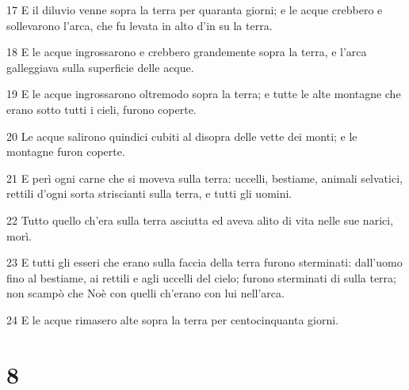 \par 17 E il diluvio venne sopra la terra per quaranta giorni; e le acque crebbero e sollevarono l'arca, che fu levata in alto d'in su la terra.
\par 18 E le acque ingrossarono e crebbero grandemente sopra la terra, e l'arca galleggiava sulla superficie delle acque.
\par 19 E le acque ingrossarono oltremodo sopra la terra; e tutte le alte montagne che erano sotto tutti i cieli, furono coperte.
\par 20 Le acque salirono quindici cubiti al disopra delle vette dei monti; e le montagne furon coperte.
\par 21 E perì ogni carne che si moveva sulla terra: uccelli, bestiame, animali selvatici, rettili d'ogni sorta striscianti sulla terra, e tutti gli uomini.
\par 22 Tutto quello ch'era sulla terra asciutta ed aveva alito di vita nelle sue narici, morì.
\par 23 E tutti gli esseri che erano sulla faccia della terra furono sterminati: dall'uomo fino al bestiame, ai rettili e agli uccelli del cielo; furono sterminati di sulla terra; non scampò che Noè con quelli ch'erano con lui nell'arca.
\par 24 E le acque rimasero alte sopra la terra per centocinquanta giorni.

\chapter{8}

